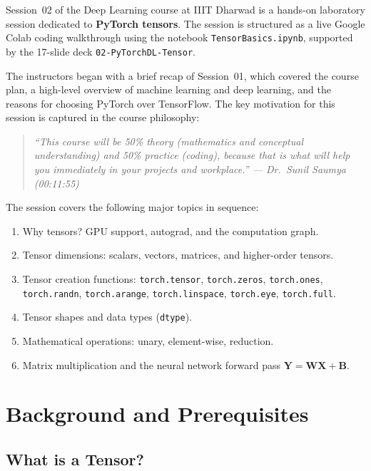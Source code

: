 \documentclass[12pt,a4paper]{article}
\newcommand{\tbf}[1]{\textbf{#1}}
\newcommand{\ttt}[1]{\texttt{#1}}
\begin{document}
Session~02 of the Deep Learning course at IIIT Dharwad is a hands-on
laboratory session dedicated to \tbf{PyTorch tensors}. The session is
structured as a live Google Colab coding walkthrough using the notebook
\ttt{TensorBasics.ipynb}, supported by the 17-slide deck
\ttt{02-PyTorchDL-Tensor}.

The instructors began with a brief recap of Session~01, which covered the
course plan, a high-level overview of machine learning and deep learning, and
the reasons for choosing PyTorch over TensorFlow. The key motivation for this
session is captured in the course philosophy:

\begin{quote}
  \itshape ``This course will be 50\% theory (mathematics and conceptual
  understanding) and 50\% practice (coding), because that is what will help you
  immediately in your projects and workplace.''
  \upshape \quad --- Dr.\ Sunil Saumya (00:11:55)
\end{quote}

The session covers the following major topics in sequence:
\begin{enumerate}[label=\arabic*.]
  \item Why tensors? GPU support, autograd, and the computation graph.
  \item Tensor dimensions: scalars, vectors, matrices, and higher-order tensors.
  \item Tensor creation functions: \ttt{torch.tensor}, \ttt{torch.zeros},
        \ttt{torch.ones}, \ttt{torch.randn}, \ttt{torch.arange},
        \ttt{torch.linspace}, \ttt{torch.eye}, \ttt{torch.full}.
  \item Tensor shapes and data types (\ttt{dtype}).
  \item Mathematical operations: unary, element-wise, reduction.
  \item Matrix multiplication and the neural network forward pass
        $\mathbf{Y} = \mathbf{W}\mathbf{X} + \mathbf{B}$.
\end{enumerate}

\section{Background and Prerequisites}
\label{sec:background}

\subsection{What is a Tensor?}
\end{document}
